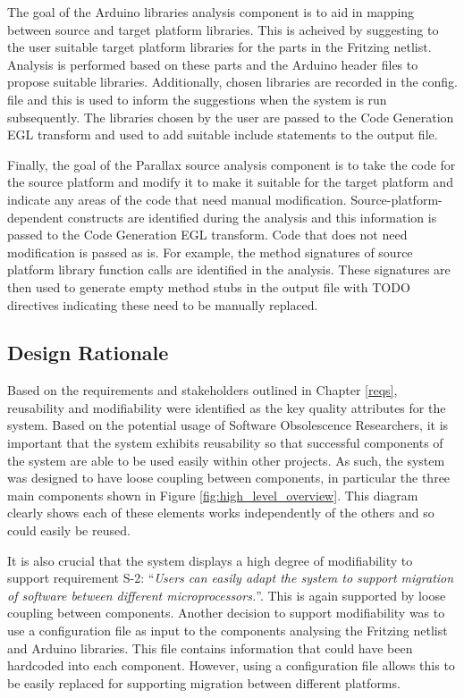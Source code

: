 \documentclass{UoYCSproject}
\begin{document}
The goal of the Arduino libraries analysis component is to aid in mapping between source and target platform libraries. This is acheived by suggesting to the user suitable target platform libraries for the parts in the Fritzing netlist. Analysis is performed based on these parts and the Arduino header files to propose suitable libraries. Additionally, chosen libraries are recorded in the config. file and this is used to inform the suggestions when the system is run subsequently. The libraries chosen by the user are passed to the Code Generation EGL transform and used to add suitable include statements to the output file.

Finally, the goal of the Parallax source analysis component is to take the code for the source platform and modify it to make it suitable for the target platform and indicate any areas of the code that need manual modification. Source-platform-dependent constructs are identified during the analysis and this information is passed to the Code Generation EGL transform. Code that does not need modification is passed as is. For example, the method signatures of source platform library function calls are identified in the analysis. These signatures are then used to generate empty method stubs in the output file with TODO directives indicating these need to be manually replaced.

\subsection{Design Rationale}
Based on the requirements and stakeholders outlined in Chapter \ref{reqs}, reusability and modifiability were identified as the key quality attributes for the system. Based on the potential usage of Software Obsolescence Researchers, it is important that the system exhibits reusability so that successful components of the system are able to be used easily within other projects. As such, the system was designed to have loose coupling between components, in particular the three main components shown in Figure \ref{fig:high_level_overview}. This diagram clearly shows each of these elements works independently of the others and so could easily be reused. 

It is also crucial that the system displays a high degree of modifiability to support requirement S-2: ``\textit{Users can easily adapt the system to support migration of software between different microprocessors.}''. This is again supported by loose coupling between components. Another decision to support modifiability was to use a configuration file as input to the components analysing the Fritzing netlist and Arduino libraries. This file contains information that could have been hardcoded into each component. However, using a configuration file allows this to be easily replaced for supporting migration between different platforms.
\end{document}
